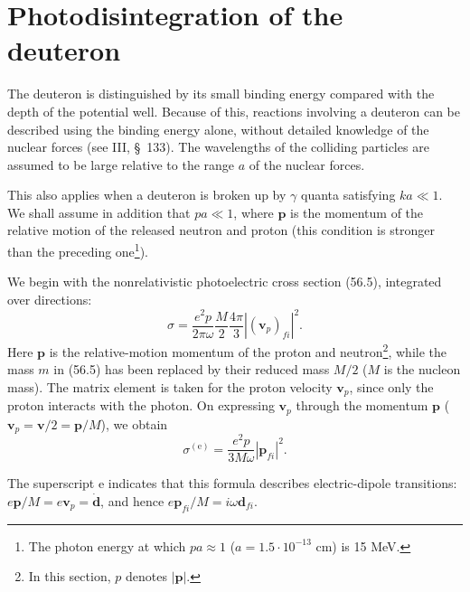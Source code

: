 \section{Photodisintegration of the deuteron}

The deuteron is distinguished by its small binding energy compared with the depth of the potential well. Because of this, reactions involving a deuteron can be described using the binding energy alone, without detailed knowledge of the nuclear forces (see III, \S~133). The wavelengths of the colliding particles are assumed to be large relative to the range $a$ of the nuclear forces.

This also applies when a deuteron is broken up by $\gamma$ quanta satisfying $ka\ll1$. We shall assume in addition that $pa\ll1$, where $\mathbf p$ is the momentum of the relative motion of the released neutron and proton (this condition is stronger than the preceding one\footnote{The photon energy at which $pa\approx1$ ($a=1.5\cdot10^{-13}$ cm) is 15 MeV.}).

We begin with the nonrelativistic photoelectric cross section (56.5), integrated over directions:
\[
\sigma=\frac{e^2p}{2\pi\omega}\frac M2\frac{4\pi}{3}|(\mathbf v_p)_{fi}|^2.
\]
Here $\mathbf p$ is the relative-motion momentum of the proton and neutron\footnote{In this section, $p$ denotes $|\mathbf p|$.}, while the mass $m$ in (56.5) has been replaced by their reduced mass $M/2$ ($M$ is the nucleon mass). The matrix element is taken for the proton velocity $\mathbf v_p$, since only the proton interacts with the photon. On expressing $\mathbf v_p$ through the momentum $\mathbf p$ ($\mathbf v_p=\mathbf v/2=\mathbf p/M$), we obtain
\begin{equation}
\sigma^{(\mathrm e)}=\frac{e^2p}{3M\omega}|\mathbf p_{fi}|^2.
\tag{58.1}
\end{equation}

The superscript $\mathrm e$ indicates that this formula describes electric-dipole transitions: $e\mathbf p/M=e\mathbf v_p=\dot{\mathbf d}$, and hence $e\mathbf p_{fi}/M=i\omega\mathbf d_{fi}$.

